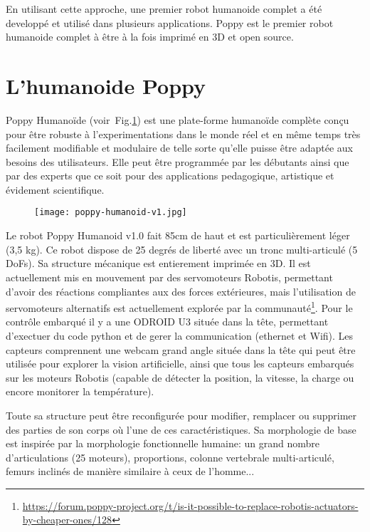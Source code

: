 En utilisant cette approche, une premier robot humanoide complet a été developpé et utilisé dans plusieurs applications. Poppy est le premier robot humanoide complet à être à la fois imprimé en 3D et open source. 


\section*{L'humanoide Poppy} %

Poppy Humanoïde (voir~Fig.\ref{fig:poppy_humanoid_v1}) est une plate-forme humanoïde complète conçu pour être robuste à l'experimentations dans le monde réel et en même temps très facilement modifiable et modulaire de telle sorte qu'elle puisse être adaptée aux besoins des utilisateurs. Elle peut être programmée par les débutants ainsi que par des experts que ce soit pour des applications pedagogique, artistique et évidement scientifique.

  \begin{figure}[h]
      \begin{center}
          \texttt{[image: poppy-humanoid-v1.jpg]}
      \end{center}
      \caption{}
      \label{fig:poppy_humanoid_v1}
  \end{figure}

Le robot Poppy Humanoid v1.0 fait 85cm de haut et est particulièrement léger (3,5 kg). Ce robot dispose de 25 degrés de liberté avec un tronc multi-articulé (5 DoFs). Sa structure mécanique est entierement imprimée en 3D. Il est actuellement mis en mouvement par des servomoteurs Robotis, permettant d'avoir des réactions compliantes aux des forces extérieures, mais l'utilisation de servomoteurs alternatifs est actuellement explorée par la communauté\footnote{\url{https://forum.poppy-project.org/t/is-it-possible-to-replace-robotis-actuators-by-cheaper-ones/128}}.
Pour le contrôle embarqué il y a une ODROID U3 située dans la tête, permettant d'exectuer du code python et de gerer la communication (ethernet et Wifi).
Les capteurs comprennent une webcam grand angle située dans la tête qui peut être utilisée pour explorer la vision artificielle, ainsi que tous les capteurs embarqués sur les moteurs Robotis (capable de détecter la position, la vitesse, la charge ou encore monitorer la température).

Toute sa structure peut être reconfigurée pour modifier, remplacer ou supprimer des parties de son corps où l'une de ces caractéristiques. Sa morphologie de base est inspirée par la morphologie fonctionnelle humaine: un grand nombre d'articulations (25 moteurs), proportions, colonne vertebrale multi-articulé, femurs inclinés de manière similaire à ceux de l'homme...


